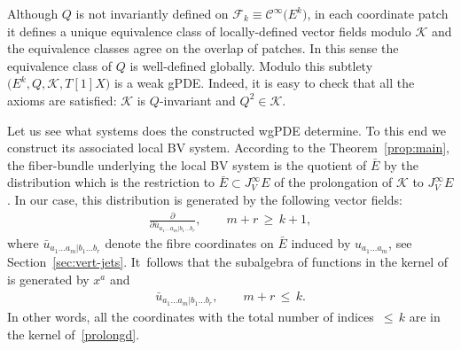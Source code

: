 \documentclass[10pt,a4paper]{amsart}
\numberwithin{equation}{section}
\theoremstyle{definition}
\newcommand{\changed}[1]{{#1}}
\renewcommand{\tilde}{\widetilde}
\newcommand{\cF}{\mathcal{F}}
\renewcommand{\geq}{\,{\geqslant}\,}
\renewcommand{\leq}{\,{\leqslant}\,}
\newcommand{\cC}{\mathcal{C}}
\def\cK{\mathcal{K}}
\newcommand{\vprol}{\tilde}
\begin{document}
Although $Q$ is not invariantly defined on $\cF_k\equiv \cC^\infty\bigl(E^k\bigr)$, in each coordinate patch it defines
a unique equivalence class of locally-defined vector fields modulo $\cK$ and the equivalence classes agree on the overlap of patches. In this sense the equivalence class of $Q$ is well-defined globally. Modulo this subtlety $\bigl(E^k,Q,\cK,T[1]X\bigr)$ is a weak gPDE. Indeed, it is easy to check that all the axioms are satisfied: $\cK$ is $Q$-invariant and $Q^2\in \cK$.

Let us see what systems does the constructed wgPDE determine. To this end we construct its associated local BV system. According to the Theorem~\ref{prop:main}, the fiber-bundle underlying the local BV system is the quotient of $\bar E$ by the distribution \smash{$\vprol{\cK}_0$} which is the restriction to $\bar E \subset J^{\infty}_VE$ of the prolongation of $\mathcal{K}$ to $J^{\infty}_VE$. In our case, this distribution is generated by the following vector fields:
\begin{equation}\label{prolongd}
 \begin{gathered}
\frac{\partial}{\partial\bar u_{a_1\dots a_{m}|b_1\dots b_{r}}} ,\qquad m+r\geq k+1,
 \end{gathered}
\end{equation}
\changed{where $\bar{u}_{a_1\dots a_m|b_1\dots b_r}$ denote the fibre coordinates on $\bar{E}$ induced by $u_{a_1\dots a_m}$, see Section~\ref{sec:vert-jets}.} It~follows that the subalgebra of functions in the kernel of \smash{$\vprol{\cK}_0$} is generated by $x^a$ and{\samepage
\begin{gather*}
 \bar{u}_{a_1\dots a_m|b_1\dots b_r},
 \qquad m+r\leq k.%
 \end{gather*}
In other words, all the coordinates with the total number of indices $\leq k$ are in the kernel of~\eqref{prolongd}.}
\end{document}
